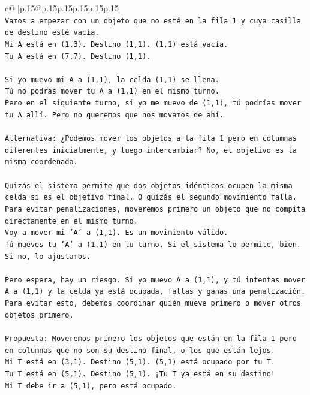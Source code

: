 \documentclass{article}
\begin{document}
{\begin{supertabular}{c@{$\;$}|p{.15\linewidth}@{}p{.15\linewidth}p{.15\linewidth}p{.15\linewidth}p{.15\linewidth}p{.15\linewidth}}
{{{\\ 
\texttt{Vamos a empezar con un objeto que no esté en la fila 1 y cuya casilla de destino esté vacía.} \\
\texttt{Mi A está en (1,3). Destino (1,1). (1,1) está vacía.} \\
\texttt{Tu A está en (7,7). Destino (1,1).} \\
\\ 
\texttt{Si yo muevo mi A a (1,1), la celda (1,1) se llena.} \\
\texttt{Tú no podrás mover tu A a (1,1) en el mismo turno.} \\
\texttt{Pero en el siguiente turno, si yo me muevo de (1,1), tú podrías mover tu A allí. Pero no queremos que nos movamos de ahí.} \\
\\ 
\texttt{Alternativa: ¿Podemos mover los objetos a la fila 1 pero en columnas diferentes inicialmente, y luego intercambiar? No, el objetivo es la misma coordenada.} \\
\\ 
\texttt{Quizás el sistema permite que dos objetos idénticos ocupen la misma celda si es el objetivo final. O quizás el segundo movimiento falla.} \\
\texttt{Para evitar penalizaciones, moveremos primero un objeto que no compita directamente en el mismo turno.} \\
\texttt{Voy a mover mi 'A' a (1,1). Es un movimiento válido.} \\
\texttt{Tú mueves tu 'A' a (1,1) en tu turno. Si el sistema lo permite, bien. Si no, lo ajustamos.} \\
\\ 
\texttt{Pero espera, hay un riesgo. Si yo muevo A a (1,1), y tú intentas mover A a (1,1) y la celda ya está ocupada, fallas y ganas una penalización.} \\
\texttt{Para evitar esto, debemos coordinar quién mueve primero o mover otros objetos primero.} \\
\\ 
\texttt{Propuesta: Moveremos primero los objetos que están en la fila 1 pero en columnas que no son su destino final, o los que están lejos.} \\
\texttt{Mi T está en (3,1). Destino (5,1). (5,1) está ocupado por tu T.} \\
\texttt{Tu T está en (5,1). Destino (5,1). ¡Tu T ya está en su destino!} \\
\texttt{Mi T debe ir a (5,1), pero está ocupado.} \\
}}}
\end{supertabular}}
\end{document}
